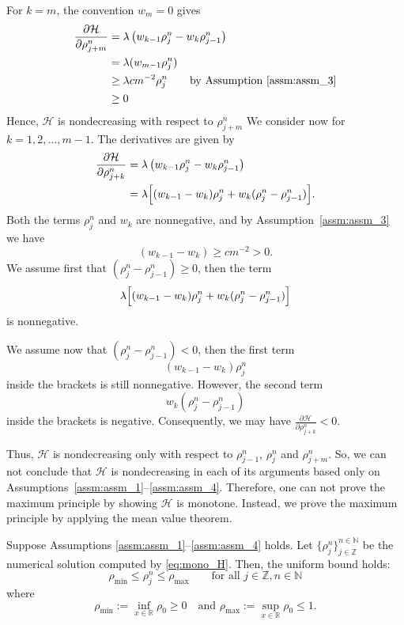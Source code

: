 For $k= m$, the convention $w_m=0$ gives
\begin{align*}
    \frac{\partial \mathcal{H}}{\partial \rho_{j+m}^n} & = \lambda\left( w_{k-1}\rho_j^n -w_k\rho_{j-1}^n\right)                     \\
                                                       & =\lambda (w_{m-1}\rho_j^n)                                                  \\
                                                       & \geq \lambda cm^{-2} \rho_j^n \qquad \text{by Assumption~\ref{assm:assm_3}} \\
                                                       & \geq 0
\end{align*}
Hence, $\mathcal{H}$ is nondecreasing with respect to $\rho_{j+m}^n$
We consider now for $k= 1,2,\dots, m-1$. The derivatives are given by
\begin{align*}
    \frac{\partial \mathcal{H}}{\partial \rho_{j+k}^n} & = \lambda\left( w_{k-1}\rho_j^n -w_k\rho_{j-1}^n\right)                       \\
                                                       & =\lambda \Bigl[(w_{k-1}- w_k) \rho_j^n + w_k(\rho_j^n - \rho_{j-1}^n )\Bigr].
\end{align*}
Both the terms $\rho_j^n$ and $w_k$ are nonnegative, and by Assumption~\ref{assm:assm_3} we have
\[
    (w_{k-1}- w_k) \geq cm^{-2} > 0.
\]
We assume first that $(\rho_j^n - \rho_{j-1}^n ) \geq 0$, then the term
\[
    \lambda \Bigl[(w_{k-1}- w_k) \rho_j^n + w_k(\rho_j^n - \rho_{j-1}^n )\Bigr]
\]
is nonnegative.

We assume now that $(\rho_j^n - \rho_{j-1}^n ) < 0$, then the first term
\[
    (w_{k-1}- w_k) \rho_j^n
\]
inside the brackets is still nonnegative. However, the second term
\[
    w_k(\rho_j^n - \rho_{j-1}^n )
\]
inside the brackets is negative. Consequently, we may have $\frac{\partial \mathcal{H}}{\partial \rho_{j+k}^n} < 0$.


Thus, $\mathcal{H}$ is nondecreasing only with respect to $\rho_{j-1}^n$, $\rho_{j}^n$ and  $\rho_{j+m}^n$. So, we can not conclude that $\mathcal{H}$ is nondecreasing in each of its arguments based only on Assumptions~\ref{assm:assm_1}--\ref{assm:assm_4}. Therefore, one can not prove the maximum principle by showing $\mathcal{H}$ is monotone. Instead, we prove the maximum principle by applying the mean value theorem.


\begin{theorem}\label{the:theorem_1}
    Suppose Assumptions \ref{assm:assm_1}--\ref{assm:assm_4} holds. Let $\{\rho_j^n\}_{j \in \mathbb{Z}}^{ n \in \mathbb{N}}$ be the numerical solution computed by \eqref{eq:mono_H}. Then, the  uniform bound holds:
    \[\rho_{\min} \leq \rho_{j}^{n} \leq  \rho_{\max}  \qquad \text{for all } j \in \mathbb{Z},  n \in \mathbb{N} \]
    where
    \[
        \rho_{\min} := \inf\limits_{x\in \mathbb{R}} \rho_0 \geq 0  \quad \text{and }  \rho_{\max}:= \sup\limits_{x\in \mathbb{R}} \rho_0 \leq 1.
    \]
\end{theorem}




